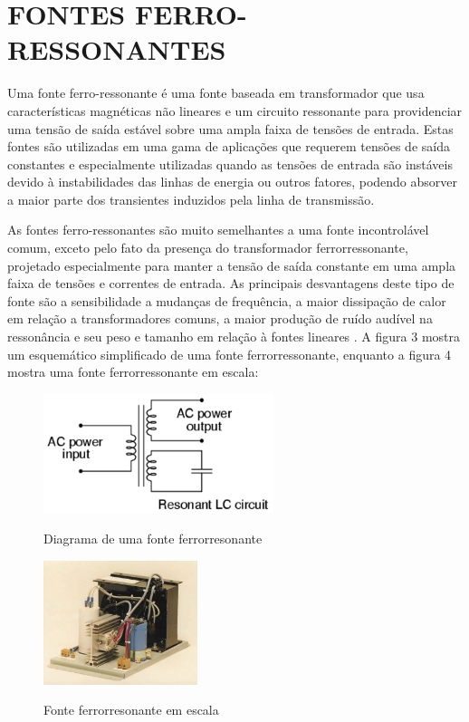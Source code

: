 \section{FONTES FERRO-RESSONANTES}
\label{sec:fontFerro}

Uma fonte ferro-ressonante é uma fonte baseada em transformador que usa características magnéticas não lineares e um circuito ressonante para providenciar uma tensão de saída estável sobre uma ampla faixa de tensões de entrada. Estas fontes são utilizadas em uma gama de aplicações que requerem tensões de saída constantes e especialmente utilizadas quando as tensões de entrada são instáveis devido à instabilidades das linhas de energia ou outros fatores, podendo absorver a maior parte dos transientes induzidos pela linha de transmissão. 

As fontes ferro-ressonantes são muito semelhantes a uma fonte incontrolável comum, exceto pelo fato da presença do transformador ferrorressonante, projetado especialmente para manter a tensão de saída constante em uma ampla faixa de tensões e correntes de entrada.  As principais desvantagens deste tipo de fonte são a sensibilidade a mudanças de frequência, a maior dissipação de calor em relação a transformadores comuns, a maior produção de ruído audível na ressonância e seu peso e tamanho em relação à fontes lineares \cite{PowerUk}. A figura 3 mostra um esquemático simplificado de uma fonte ferrorressonante, enquanto a figura 4 mostra uma fonte ferrorressonante em escala:


\begin{figure}[!htb]
    \centering
    \caption{Diagrama de uma fonte ferrorresonante}
    \includegraphics[width=0.6\textwidth]{./dados/figuras/font-ferro}
    \label{fig:figura-fontferro}
\end{figure}

\pagebreak

\begin{figure}[!htb]
    \centering
    \caption{Fonte ferrorresonante em escala}
    \includegraphics[width=0.4\textwidth]{./dados/figuras/font-ferro-real}
    \label{fig:figura-fontferro}
\end{figure}



